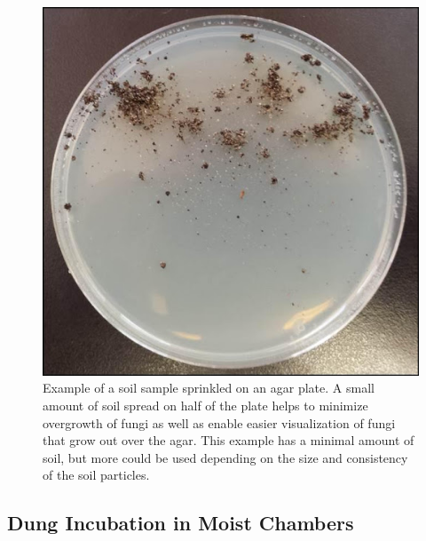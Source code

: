 \documentclass[]{book}
\begin{document}
\begin{figure}

{\centering \includegraphics[width=6.83in]{img/Fig2_Ch2} 

}

\caption{ Example of a soil sample sprinkled on an agar plate.  A small amount of soil spread on half of the plate helps to minimize overgrowth of fungi as well as enable easier visualization of fungi that grow out over the agar.  This example has a minimal amount of soil, but more could be used depending on the size and consistency of the soil particles.}\label{fig:ch2fig2}
\end{figure}

\subsection{Dung Incubation in Moist
Chambers}\label{dung-incubation-in-moist-chambers}
\end{document}
